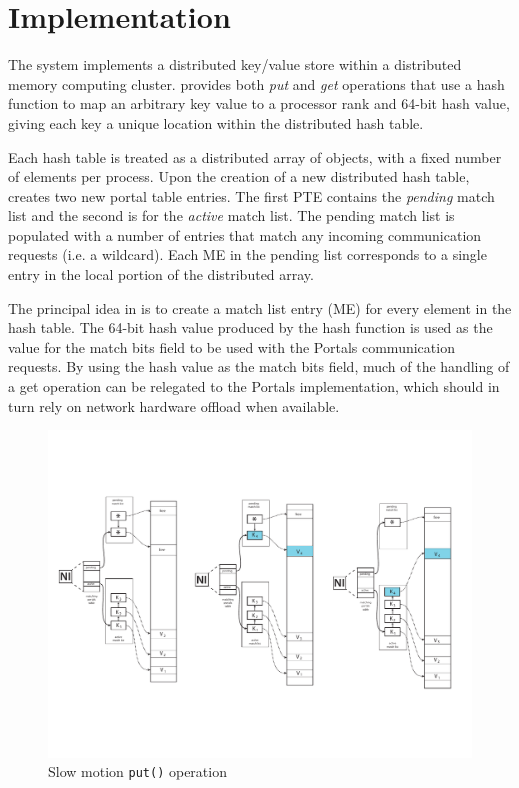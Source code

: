 \section{Implementation}


The \pdht system implements a distributed key/value store within a
distributed memory computing cluster. \pdht provides both {\em put}
and {\em get} operations that use a hash function to map an arbitrary
key value to a processor rank and 64-bit hash value, giving each key a
unique location within the distributed hash table.

Each hash table is treated as a distributed array of objects, with a
fixed number of elements per process. Upon the creation of a new
distributed hash table, \pdht creates two new portal table
entries. The first PTE contains the {\em pending} match list and the
second is for the {\em active} match list. The pending match list is
populated with a number of entries that match any incoming
communication requests (i.e. a wildcard). Each ME in the pending list
corresponds to a single entry in the local portion of the distributed
array.

The principal idea in \pdht is to create a match list entry (ME) for
every element in the hash table. The 64-bit hash value produced by the
hash function is used as the value for the match bits field to be used
with the Portals communication requests. By using the hash value as
the match bits field, much of the handling of a get operation can be
relegated to the Portals implementation, which should in turn rely on
network hardware offload when available.

\begin{figure}[ht]
  \centering
  \includegraphics[scale=.35]{figs/put}
  \caption{Slow motion {\tt put()} operation}
  \label{fig:put}
\end{figure}


